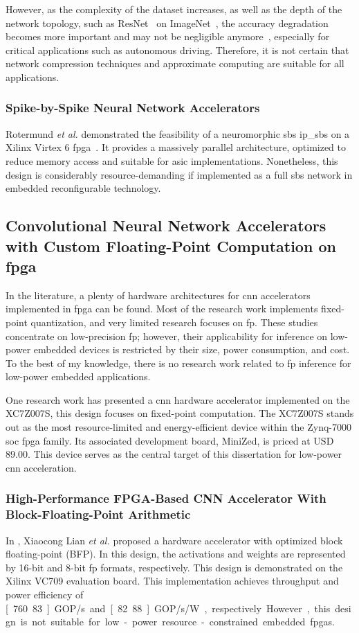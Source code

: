 However, as the complexity of the dataset increases, as well as the depth of the network topology, such as ResNet~\cite{he2016deep} on ImageNet~\cite{russakovsky2015imagenet}, the accuracy degradation becomes more important and may not be negligible anymore~\cite{rastegari2016xnor}, especially for critical applications such as autonomous driving. Therefore, it is not certain that network compression techniques and approximate computing are suitable for all applications.

\subsubsection{Spike-by-Spike Neural Network Accelerators}
Rotermund \textit{et al.} demonstrated the feasibility of a neuromorphic \gls{sbs} \gls{ip_sbs} on a Xilinx Virtex 6 \gls{fpga}~\cite{rotermund2018massively}. It provides a massively parallel architecture, optimized to reduce memory access and suitable for \gls{asic} implementations. Nonetheless, this design is considerably resource-demanding if implemented as a full \gls{sbs} network in embedded reconfigurable technology.

\subsection{Convolutional Neural Network Accelerators with Custom Floating-Point Computation on \gls{fpga}
}
\label{sec:related_work}
In the literature, a plenty of hardware architectures for \gls{cnn} accelerators implemented in \gls{fpga} can be found. Most of the research work implements fixed-point quantization, and very limited research focuses on \gls{fp}. These studies concentrate on low-precision \gls{fp}; however, their applicability for inference on low-power embedded devices is restricted by their size, power consumption, and cost. To the best of my knowledge, there is no research work related to \gls{fp} inference for low-power embedded applications.

One research work has presented a \gls{cnn} hardware accelerator implemented on the XC7Z007S, this design focuses on fixed-point computation. The XC7Z007S stands out as the most resource-limited and energy-efficient device within the Zynq-7000 \gls{soc} \gls{fpga} family. Its associated development board, MiniZed, is priced at USD 89.00. This device serves as the central target of this dissertation for low-power \gls{cnn} acceleration.


\subsubsection{High-Performance FPGA-Based CNN Accelerator With Block-Floating-Point Arithmetic}
In \cite{lian2019high}, Xiaocong Lian \textit{et al.} proposed a hardware accelerator with optimized block floating-point (BFP). In this design, the activations and weights are represented by 16-bit and 8-bit \gls{fp} formats, respectively. This design is demonstrated on the Xilinx VC709 evaluation board. This implementation achieves throughput and power efficiency of \unit[760.83]{GOP/s} and \unit[82.88]{GOP/s/W}, respectively. However, this design is not suitable for low-power resource-constrained embedded \glspl{fpga}.

